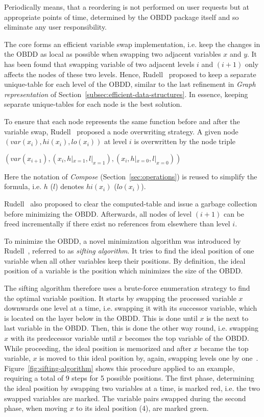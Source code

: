 \documentclass{vldb}
\begin{document}
Periodically means, that a reordering is not performed on user requests but at
appropriate points of time, determined by the OBDD package itself and so
eliminate any user responsibility.

The core forms an efficient variable swap implementation, i.e. keep the changes
in the OBDD as local as possible when swapping two adjacent variables $x$ and
$y$. It has been found that swapping variable of two adjacent levels $i$ and
$(i+1)$ only affects the nodes of these two levels. Hence, Rudell~\cite{RUDELL93}
proposed to keep a separate unique-table for each level of the OBDD, similar to
the last refinement in \textit{Graph representation} of
Section~\ref{subsec:efficient-data-structures}. In essence, keeping separate 
unique-tables for each node is the best solution.

To ensure that each node represents the same function before and after the variable
swap, Rudell~\cite{RUDELL93} proposed a node overwriting strategy. A given node
$(var(x_i), hi(x_i), lo(x_i))$ at level $i$ is overwritten by the node triple
\begin{center}
$(var(x_{i+1}), (x_i, h|_{x=1}, l|_{x=1}), (x_i, h|_{x=0}, l|_{x=0}))$
\end{center}
Here the notation of \textit{Compose} (Section~\ref{sec:operations}) is reused
to simplify the formula, i.e. $h$ ($l$) denotes $hi(x_i)$ ($lo(x_i)$).

Rudell~\cite{RUDELL93} also proposed to clear the computed-table and issue a
garbage collection before minimizing the OBDD. Afterwards, all nodes of level
$(i+1)$ can be freed incrementally if there exist no references from elsewhere
than level $i$.

To minimize the OBDD, a novel minimization algorithm was introduced by
Rudell~\cite{RUDELL93}, referred to as \textit{sifting algorithm}. It tries to
find the ideal position of one variable when all other variables keep their
positions. By definition, the ideal position of a variable is the position which
minimizes the size of the OBDD.

The sifting algorithm therefore uses a brute-force enumeration strategy to find
the optimal variable position. It starts by swapping the processed variable $x$
downwards one level at a time, i.e. swapping it with its successor variable, which
is located on the layer below in the OBDD. This is done until $x$ is the next to
last variable in the OBDD. Then, this is done the other way round, i.e. swapping
$x$ with its predecessor variable until $x$ becomes the top variable of the OBDD.
While proceeding, the ideal position is memorized and after $x$ became the top
variable, $x$ is moved to this ideal position by, again, swapping levels one by
one~\cite{RUDELL93}. Figure~\ref{fig:sifting-algorithm} shows this procedure
applied to an example, requiring a total of 9 steps for 5 possible positions. The
first phase, determining the ideal position by swapping two variables at a time,
is marked red, i.e. the two swapped variables are marked. The variable pairs
swapped during the second phase, when moving $x$ to its ideal position (4), are
marked green. 
\end{document}
